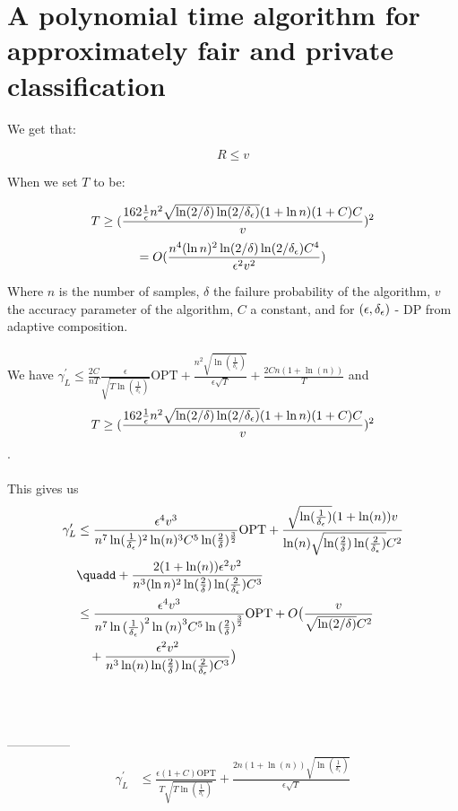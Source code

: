 
\section{A polynomial time algorithm for approximately fair and private classification}

We get that:

$$R \leq v$$

When we set $T$ to be:

$$T \geq (\frac{162\frac{1}{\epsilon}n^2 \sqrt{\ln(2/\delta) \ln(2/\delta_\epsilon)}(1+\ln n)(1+C)C}{v})^2$$
$$= O(\frac{n^4(\ln n)^2 \ln(2/\delta) \ln(2/\delta_\epsilon)C^4}{\epsilon^2 v^2})$$

Where $n$ is the number of samples, $\delta$ the failure probability of the algorithm, $v$ the accuracy parameter of the algorithm, $C$ a constant, and for $(\epsilon, \delta_\epsilon)$ - DP from adaptive composition.
\\ \\
\newpage
We have $\gamma_L^\prime \leq \frac{2C}{nT}
\frac{\epsilon}
{\sqrt{T\ln{(
\frac{1}{\delta_{\epsilon}}
)}}} \text{OPT}
+
\frac{n^2
\sqrt{\ln{(\frac{1}{\delta_\epsilon})}}
}{\epsilon\sqrt{T}}
+
\frac{2Cn(1+\ln{(n)})}{T}$
%
%
and $$T \geq (\frac{162\frac{1}{\epsilon}n^2 \sqrt{\ln(2/\delta) \ln(2/\delta_\epsilon)}(1+\ln n)(1+C)C}{v})^2$$.
%
\\ \\
This gives us
%
\begin{align*}
\gamma_L^\prime &\leq \frac{\epsilon^4 v^3}{ n^7 \ln(\frac{1}{\delta_\epsilon})^2 \ln(n)^3 C^5 \ln(\frac{2}{\delta})^{\frac{3}{2}} } \text{OPT}
+
\frac{ \sqrt{\ln(\frac{1}{\delta_\epsilon})} (1 + \ln(n)) v }
{ \ln(n) \sqrt{ \ln(\frac{2}{\delta}) \ln(\frac{2}{\delta_\epsilon})} C^2 } \\
& \quadd +
\frac{ 2(1 + \ln(n)) \epsilon^2 v^2 }
{ n^3 (\ln n)^2 \ln(\frac{2}{\delta}) \ln(\frac{2}{\delta_\eps}) C^3 }
\\
&\leq
\frac{\epsilon^4 v^3}{ n^7 \ln{(\frac{1}{\delta_\epsilon})}^2 \ln{(n)}^3 C^5 \ln{(\frac{2}{\delta})}^{\frac{3}{2}} } \text{OPT}
+
O \big(
\frac{v}{\sqrt{\ln(2/\delta)}C^2}
\\
&\quad +
\frac{ \epsilon^2 v^2 }
{ n^3 \ln (n) \ln(\frac{2}{\delta}) \ln(\frac{2}{\delta_\eps}) C^3 } \big)
\end{align*}
%
%
\\ \\ \\
---------------
\begin{align*}
  \gamma_L^\prime &\leq \frac{\epsilon(1+C)\text{OPT}}
  {T\sqrt{T\ln(\frac{1}{\delta_\epsilon})}} +
  \frac{2n(1+\ln(n))\sqrt{\ln(\frac{1}{\delta_\epsilon})}}{\epsilon\sqrt{T}}
\end{align*}
\\

